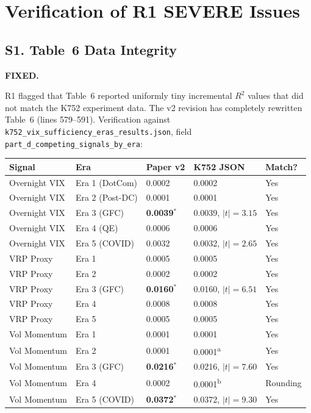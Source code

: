 \documentclass[12pt,a4paper]{article}
\begin{document}
\section*{Verification of R1 SEVERE Issues}

\subsection*{S1. Table~6 Data Integrity}
\textcolor{fixedblue}{\textbf{FIXED.}}

R1 flagged that Table~6 reported uniformly tiny incremental $R^2$ values that did not match the K752 experiment data. The v2 revision has completely rewritten Table~6 (lines 579--591). Verification against \texttt{k752\_vix\_sufficiency\_eras\_results.json}, field \texttt{part\_d\_competing\_signals\_by\_era}:

\medskip
\begin{tabular}{lllll}
\toprule
Signal & Era & Paper v2 & K752 JSON & Match? \\
\midrule
Overnight VIX & Era 1 (DotCom) & 0.0002 & 0.0002 & \textcolor{okgreen}{Yes} \\
Overnight VIX & Era 2 (Post-DC) & 0.0001 & 0.0001 & \textcolor{okgreen}{Yes} \\
Overnight VIX & Era 3 (GFC) & \textbf{0.0039}$^*$ & 0.0039, $|t|=3.15$ & \textcolor{okgreen}{Yes} \\
Overnight VIX & Era 4 (QE) & 0.0006 & 0.0006 & \textcolor{okgreen}{Yes} \\
Overnight VIX & Era 5 (COVID) & 0.0032 & 0.0032, $|t|=2.65$ & \textcolor{okgreen}{Yes} \\[0.3em]
VRP Proxy & Era 1 & 0.0005 & 0.0005 & \textcolor{okgreen}{Yes} \\
VRP Proxy & Era 2 & 0.0002 & 0.0002 & \textcolor{okgreen}{Yes} \\
VRP Proxy & Era 3 (GFC) & \textbf{0.0160}$^*$ & 0.0160, $|t|=6.51$ & \textcolor{okgreen}{Yes} \\
VRP Proxy & Era 4 & 0.0008 & 0.0008 & \textcolor{okgreen}{Yes} \\
VRP Proxy & Era 5 & 0.0005 & 0.0005 & \textcolor{okgreen}{Yes} \\[0.3em]
Vol Momentum & Era 1 & 0.0001 & 0.0001 & \textcolor{okgreen}{Yes} \\
Vol Momentum & Era 2 & 0.0001 & 0.0001\textsuperscript{a} & \textcolor{okgreen}{Yes} \\
Vol Momentum & Era 3 (GFC) & \textbf{0.0216}$^*$ & 0.0216, $|t|=7.60$ & \textcolor{okgreen}{Yes} \\
Vol Momentum & Era 4 & 0.0002 & 0.0001\textsuperscript{b} & \textcolor{warncolor}{Rounding} \\
Vol Momentum & Era 5 (COVID) & \textbf{0.0372}$^*$ & 0.0372, $|t|=9.30$ & \textcolor{okgreen}{Yes} \\
\bottomrule
\end{tabular}
\end{document}
